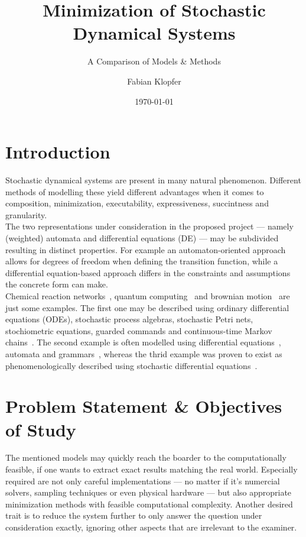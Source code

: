 \documentclass[11pt, rgb]{scrartcl}
\date{\today}
\author{Fabian Klopfer}
\title{Minimization of Stochastic Dynamical Systems}
\subtitle{A Comparison of Models \& Methods}
\begin{document}
\restoregeometry


\section{Introduction} Stochastic dynamical systems are present in many natural phenomenon. 
Different methods of modelling these yield different advantages when it comes to composition, minimization, executability, expressiveness, succintness and granularity. \\

The two representations under consideration in the proposed project --- namely (weighted) automata and differential equations (DE) --- may be subdivided resulting in distinct properties. For example an automaton-oriented approach allows for degrees of freedom when defining the transition function, while a differential equation-based approach differs in the constraints and assumptions the concrete form can make. \\

 Chemical reaction networks~\autocite{mc_agg_crn}, quantum computing~\autocite{moore2000quantum} and brownian motion~\autocite{einstein1906theory} are just some examples.
 The first one may be described using ordinary differential equations (ODEs), stochastic process algebras, stochastic Petri nets, stochiometric equations, guarded commands and continuous-time Markov chains~\cite{wolf}.
 The second example is often modelled using differential equations~\autocite{von2018mathematical}, automata and grammars~\autocite{moore2000quantum}, whereas the thrid example was proven to exist as phenomenologically described using stochastic differential equations~\autocite{einstein1906theory}.
 

\section{Problem Statement \& Objectives of Study}
The mentioned models may quickly reach the boarder to the computationally feasible, if one wants to extract exact results matching the real world. 
Especially required are not only careful implementations --- no matter if it's numercial solvers, sampling techniques or even physical hardware --- but also appropriate minimization methods with feasible computational complexity. 
Another desired trait is to reduce the system further to only answer the question under consideration exactly, ignoring other aspects that are irrelevant to the examiner. \\
\end{document}

